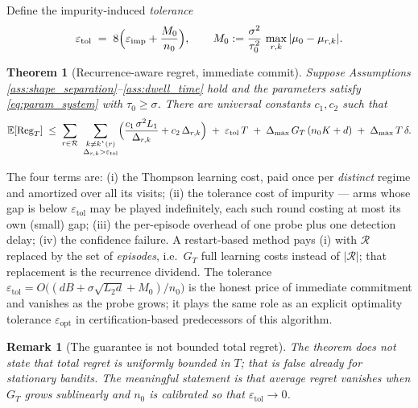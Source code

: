 \documentclass[11pt]{article}
\newtheorem{theorem}{Theorem}
\newtheorem{remark}{Remark}
\newcommand{\Rcal}{\mathcal R}
\newcommand{\E}{\mathbb E}
\newcommand{\Reg}{\mathrm{Reg}}
\newcommand{\eimp}{\varepsilon_{\mathrm{imp}}}
\newcommand{\etol}{\varepsilon_{\mathrm{tol}}}
\begin{document}
Define the impurity-induced \emph{tolerance}
\begin{equation}
    \etol
    \;=\;
    8\Bigl(\eimp+\frac{M_0}{n_0}\Bigr),
    \qquad
    M_0:=\frac{\sigma^2}{\tau_0^2}\,\max_{r,k}|\mu_0-\mu_{r,k}| .
    \label{eq:tolerance}
\end{equation}

\begin{theorem}[Recurrence-aware regret, immediate commit]
\label{thm:main}
Suppose Assumptions \ref{ass:shape_separation}--\ref{ass:dwell_time} hold and the parameters satisfy \eqref{eq:param_system} with $\tau_0\ge\sigma$. There are universal constants $c_1,c_2$ such that
\begin{equation}
    \E[\Reg_T]
    \;\le\;
    \sum_{r\in\Rcal}\ \sum_{\substack{k\ne k^\star(r)\\ \Delta_{r,k}>\etol}}
    \Bigl(
    \frac{c_1\,\sigma^2 L_1}{\Delta_{r,k}}
    +c_2\,\Delta_{r,k}
    \Bigr)
    \;+\;
    \etol\,T
    \;+\;
    \Delta_{\max}\,G_T\,(n_0K+d)
    \;+\;
    \Delta_{\max}\,T\,\delta .
    \label{eq:main_bound}
\end{equation}
\end{theorem}

The four terms are: (i) the Thompson learning cost, paid once per \emph{distinct} regime and amortized over all its visits; (ii) the tolerance cost of impurity --- arms whose gap is below $\etol$ may be played indefinitely, each such round costing at most its own (small) gap; (iii) the per-episode overhead of one probe plus one detection delay; (iv) the confidence failure. A restart-based method pays (i) with $\Rcal$ replaced by the set of \emph{episodes}, i.e.\ $G_T$ full learning costs instead of $|\Rcal|$; that replacement is the recurrence dividend. The tolerance $\etol=O\bigl((dB+\sigma\sqrt{L_2 d}+M_0)/n_0\bigr)$ is the honest price of immediate commitment and vanishes as the probe grows; it plays the same role as an explicit optimality tolerance $\varepsilon_{\mathrm{opt}}$ in certification-based predecessors of this algorithm.

\begin{remark}[The guarantee is not bounded total regret]
The theorem does not state that total regret is uniformly bounded in $T$; that is false already for stationary bandits. The meaningful statement is that average regret vanishes when $G_T$ grows sublinearly and $n_0$ is calibrated so that $\etol\to0$.
\end{remark}

\end{document}
